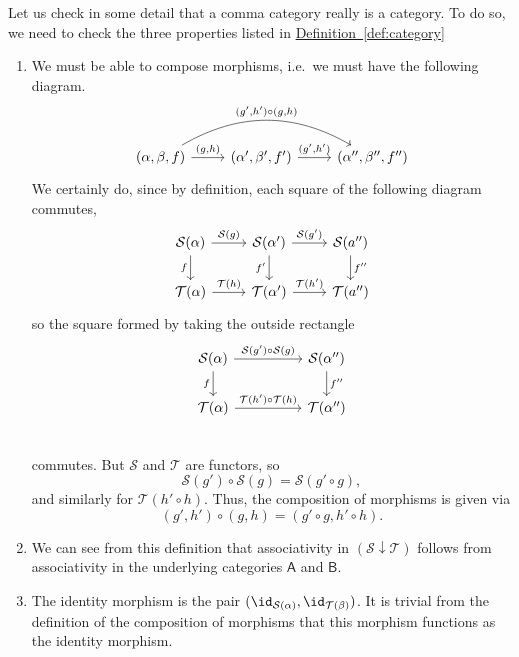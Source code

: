 \documentclass[notes.tex]{subfiles}
\begin{document}
Let us check in some detail that a comma category really is a category. To do so, we need to check the three properties listed in \hyperref[def:category]{Definition~\ref*{def:category}}
\begin{enumerate}
  \item We must be able to compose morphisms, i.e.\ we must have the following diagram.
    \begin{equation*}
      \begin{tikzcd}
        {(\alpha, \beta, f)} \arrow[r, "{(g,h)}"] \arrow[rr, bend left, "{(g', h') \circ (g, h)}"] & {(\alpha', \beta', f')} \arrow[r, "{(g', h')}"] & {(\alpha'', \beta'', f'')}
      \end{tikzcd}
    \end{equation*}
    We certainly do, since by definition, each square of the following diagram commutes,
    \begin{equation*}
      \begin{tikzcd}
        \mathcal{S}(\alpha) \arrow[r, "\mathcal{S}(g)"] \arrow[d, swap, "f"] & \mathcal{S}(\alpha') \arrow[r, "\mathcal{S}(g')"] \arrow[d, swap, "f'"] & \mathcal{S}(a'') \arrow[d, "f''"] \\
        \mathcal{T}(\alpha) \arrow[r, "\mathcal{T}(h)"] & \mathcal{T}(\alpha') \arrow[r, "\mathcal{T}(h')"] & \mathcal{T}(a'')
      \end{tikzcd}
    \end{equation*}
    so the square formed by taking the outside rectangle
    \begin{equation*}
      \begin{tikzcd}[column sep=huge]
        \mathcal{S}(\alpha) \arrow[d, swap, "f"] \arrow[r, "\mathcal{S}(g') \circ \mathcal{S}(g)"] & \mathcal{S}(\alpha'') \arrow[d, "f''"] \\
        \mathcal{T}(\alpha) \arrow[r, "\mathcal{T}(h') \circ \mathcal{T}(h)"] & \mathcal{T}(\alpha'') \\
      \end{tikzcd}
    \end{equation*}
    commutes. But $\mathcal{S}$ and $\mathcal{T}$ are functors, so
    \begin{equation*}
      \mathcal{S}(g') \circ \mathcal{S}(g) = \mathcal{S}(g' \circ g),
    \end{equation*}
    and similarly for $\mathcal{T}(h' \circ h)$. Thus, the composition of morphisms is given via
    \begin{equation*}
      (g', h') \circ (g,h) = (g'\circ g, h' \circ h).
    \end{equation*}

  \item We can see from this definition that associativity in $(\mathcal{S}\downarrow \mathcal{T})$ follows from associativity in the underlying categories $\mathsf{A}$ and $\mathsf{B}$.

  \item The identity morphism is the pair $(\id_{\mathcal{S}(\alpha)}, \id_{\mathcal{T}(\beta)})$. It is trivial from the definition of the composition of morphisms that this morphism functions as the identity morphism.
\end{enumerate}
\end{document}
